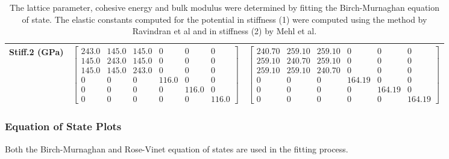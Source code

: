 \begin{table}[ht]
\begin{tabular}{lcccccc}
Stiff.2 (GPa) & \multicolumn{3}{c}{$\begin{bmatrix} 243.0 & 145.0 & 145.0 & 0 & 0 & 0 \\ 145.0 & 243.0 & 145.0 & 0 & 0 & 0 \\ 145.0 & 145.0 & 243.0 & 0 & 0 & 0 \\ 0 & 0 & 0 & 116.0 & 0 & 0 \\ 0 & 0 & 0 & 0 & 116.0 & 0 \\ 0 & 0 & 0 & 0 & 0 & 116.0 \end{bmatrix}$}   & \multicolumn{3}{c}{$\begin{bmatrix} 240.70 & 259.10 & 259.10 & 0 & 0 & 0 \\ 259.10 & 240.70 & 259.10 & 0 & 0 & 0 \\ 259.10 & 259.10 & 240.70 & 0 & 0 & 0 \\ 0 & 0 & 0 & 164.19 & 0 & 0 \\ 0 & 0 & 0 & 0 & 164.19 & 0 \\ 0 & 0 & 0 & 0 & 0 & 164.19 \end{bmatrix}$} \\
\hline\hline
\end{tabular}
\caption{The lattice parameter, cohesive energy and bulk modulus were determined by fitting the Birch-Murnaghan equation of state.  The elastic constants computed for the potential in stiffness (1) were computed using the method by Ravindran et al\cite{dfttisiravindran} and in stiffness (2) by Mehl et al\cite{mehlsp}\cite{elasticpropertiesmehl}.}
\label{table:feru-rufcc-dftvspotential}
\end{table}



\subsubsection{Equation of State Plots}

Both the Birch-Murnaghan and Rose-Vinet equation of states are used in the fitting process.

